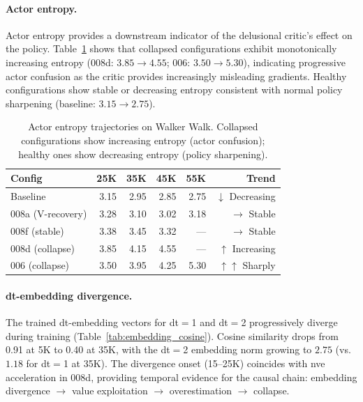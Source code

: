 \documentclass[letterpaper]{article}
\begin{document}
\paragraph{Actor entropy.}
Actor entropy provides a downstream indicator of the delusional critic's effect on the policy.
Table~\ref{tab:actor_entropy} shows that collapsed configurations exhibit monotonically increasing entropy (008d: $3.85 \to 4.55$; 006: $3.50 \to 5.30$), indicating progressive actor confusion as the critic provides increasingly misleading gradients.
Healthy configurations show stable or decreasing entropy consistent with normal policy sharpening (baseline: $3.15 \to 2.75$).

\begin{table}[t]
\centering
\caption{Actor entropy trajectories on Walker Walk. Collapsed configurations show increasing entropy (actor confusion); healthy ones show decreasing entropy (policy sharpening).}
\label{tab:actor_entropy}
\small
\begin{tabular}{lrrrrr}
\toprule
\textbf{Config} & \textbf{25K} & \textbf{35K} & \textbf{45K} & \textbf{55K} & \textbf{Trend} \\
\midrule
Baseline & 3.15 & 2.95 & 2.85 & 2.75 & $\downarrow$ Decreasing \\
008a (V-recovery) & 3.28 & 3.10 & 3.02 & 3.18 & $\to$ Stable \\
008f (stable) & 3.38 & 3.45 & 3.32 & --- & $\to$ Stable \\
008d (collapse) & 3.85 & 4.15 & 4.55 & --- & $\uparrow$ Increasing \\
006 (collapse) & 3.50 & 3.95 & 4.25 & 5.30 & $\uparrow\uparrow$ Sharply \\
\bottomrule
\end{tabular}
\end{table}

\paragraph{dt-embedding divergence.}
The trained dt-embedding vectors for dt$=$1 and dt$=$2 progressively diverge during training (Table~\ref{tab:embedding_cosine}).
Cosine similarity drops from 0.91 at 5K to 0.40 at 35K, with the dt$=$2 embedding norm growing to $2.75$ (vs.\ $1.18$ for dt$=$1 at 35K).
The divergence onset (15--25K) coincides with nve acceleration in 008d, providing temporal evidence for the causal chain: embedding divergence $\to$ value exploitation $\to$ overestimation $\to$ collapse.
\end{document}
